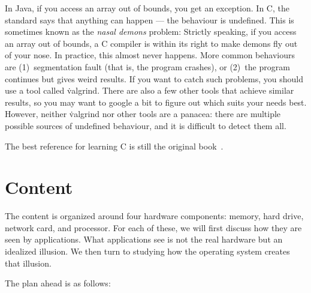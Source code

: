 In Java, if you access an array out of bounds, you get an exception.
In C, the standard says that anything can happen ---
  the behaviour is undefined.
This is sometimes known as the \emph{nasal demons} problem:
  Strictly speaking,
  if you access an array out of bounds,
  a C compiler is within its right to make demons fly out of your nose.
In practice, this almost never happens.
More common behaviours are
  (1)~segmentation fault (that is, the program crashes), or
  (2)~the program continues but gives weird results.
If you want to catch such problems,
  you should use a tool called \.{valgrind}.
There are also a few other tools that achieve similar results,
  so you may want to google a bit to figure out which suits your needs best.
However, neither \.{valgrind} nor other tools are a panacea:
  there are multiple possible sources of undefined behaviour,
  and it is difficult to detect them all.

\smallskip

The best reference for learning C is still the original book~\citep{c-book}.

\section{Content}

The content is organized around four hardware components:
  memory, hard drive, network card, and processor.
For each of these,
  we will first discuss how they are seen by applications.
What applications see is not the real hardware but an idealized illusion.
We then turn to studying how the operating system creates that illusion.

The plan ahead is as follows:

